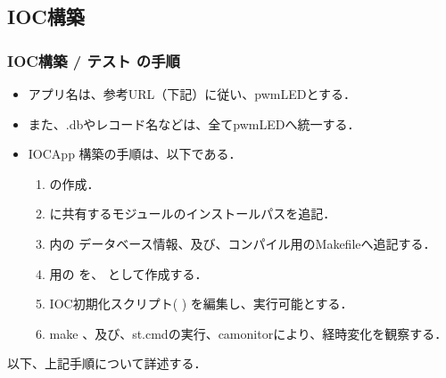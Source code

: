 \documentclass[letterpaper,10pt,dvipdfmx]{sphinxmanual}
\begin{document}
\subsection{IOC構築}
\label{\detokenize{epics/rst/example4__arduino_LEDcontrol02:ioc}}

\subsubsection{IOC構築 / テスト の手順}
\label{\detokenize{epics/rst/example4__arduino_LEDcontrol02:id3}}\begin{itemize}
\item {} 
アプリ名は、参考URL（下記）に従い、pwmLEDとする．

\item {} 
また、.dbやレコード名などは、全てpwmLEDへ統一する．

\item {} 
IOC\sphinxhyphen{}App 構築の手順は、以下である．
\begin{enumerate}
%
\item {} 
 の作成．

\item {} 
 に共有するモジュールのインストールパスを追記．

\item {} 
 内の データベース情報、及び、コンパイル用のMakefileへ追記する．

\item {} 
 用の  を、  として作成する．

\item {} 
IOC初期化スクリプト(  ) を編集し、実行可能とする．

\item {} 
make 、及び、st.cmdの実行、camonitorにより、経時変化を観察する．

\end{enumerate}

\end{itemize}

以下、上記手順について詳述する．
\end{document}
